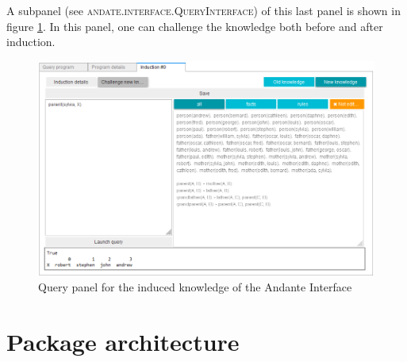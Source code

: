 \documentclass{article}
\begin{document}
A subpanel (see \textsc{andate.interface.QueryInterface}) of this last panel is
shown in figure \ref{fig:interface:queryinducedpanel}. In this panel, one can
challenge the knowledge both before and after induction.

\begin{figure}[h!]
    \includegraphics[width = \textwidth]{images/Interface - induction - query.PNG}
    \caption{Query panel for the induced knowledge of the Andante Interface}
    \label{fig:interface:queryinducedpanel}
\end{figure}

\section{Package architecture} \label{architecture}
\end{document}
